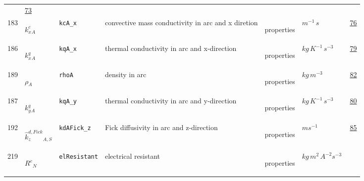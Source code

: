 \begin{longtable}{|p{1cm}|p{2.5cm}|p{4.5cm}|p{8cm}|p{3.0cm}|p{3cm}|p{1cm}|}
             &                 \hyperlink{"e:73"}{ 73 }
                 \\
            183
             & \hypertarget{"v:183"}{ $ {{k^c_x}}{_{A}} $}
             & \verb|kcA_x|
             & convective mass conductivity in arc and x diretion
             & \begin{lay}properties \end{lay}
             & $ m^{-1} \,s \, $
             &                 \hyperlink{"e:76"}{ 76 }
                 \\
            186
             & \hypertarget{"v:186"}{ $ {{k^q_x}}{_{A}} $}
             & \verb|kqA_x|
             & thermal conductivity in arc and x-direction
             & \begin{lay}properties \end{lay}
             & $ kg \,K^{-1} \,s^{-3} \, $
             &                 \hyperlink{"e:79"}{ 79 }
                 \\
            189
             & \hypertarget{"v:189"}{ $ {{\rho}}{_{A}} $}
             & \verb|rhoA|
             & density in arc
             & \begin{lay}properties \end{lay}
             & $ kg \,m^{-3} \, $
             &                 \hyperlink{"e:82"}{ 82 }
                 \\
            187
             & \hypertarget{"v:187"}{ $ {{k^q_y}}{_{A}} $}
             & \verb|kqA_y|
             & thermal conductivity in arc and y-direction
             & \begin{lay}properties \end{lay}
             & $ kg \,K^{-1} \,s^{-3} \, $
             &                 \hyperlink{"e:80"}{ 80 }
                 \\
            192
             & \hypertarget{"v:192"}{ $ {{\hat{k}^{d,Fick}_z}}{_{A, S}} $}
             & \verb|kdAFick_z|
             & Fick diffusivity in arc and z-direction
             & \begin{lay}properties \end{lay}
             & $ m s^{-1} \, $
             &                 \hyperlink{"e:85"}{ 85 }
                 \\
            219
             & \hypertarget{"v:219"}{ $ {{R^e}}{_{N}} $}
             & \verb|elResistant|
             & electrical resistant
             & \begin{lay}properties \end{lay}
             & $ kg \,m^{2} \,A^{-2} s^{-3} \, $

\end{longtable}
